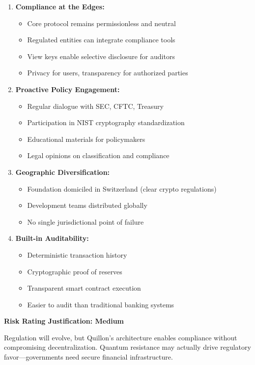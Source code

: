 \documentclass[11pt,a4paper]{article}
\begin{document}
\begin{enumerate}[leftmargin=*]
\item \textbf{Compliance at the Edges:}
\begin{itemize}
    \item Core protocol remains permissionless and neutral
    \item Regulated entities can integrate compliance tools
    \item View keys enable selective disclosure for auditors
    \item Privacy for users, transparency for authorized parties
\end{itemize}

\item \textbf{Proactive Policy Engagement:}
\begin{itemize}
    \item Regular dialogue with SEC, CFTC, Treasury
    \item Participation in NIST cryptography standardization
    \item Educational materials for policymakers
    \item Legal opinions on classification and compliance
\end{itemize}

\item \textbf{Geographic Diversification:}
\begin{itemize}
    \item Foundation domiciled in Switzerland (clear crypto regulations)
    \item Development teams distributed globally
    \item No single jurisdictional point of failure
\end{itemize}

\item \textbf{Built-in Auditability:}
\begin{itemize}
    \item Deterministic transaction history
    \item Cryptographic proof of reserves
    \item Transparent smart contract execution
    \item Easier to audit than traditional banking systems
\end{itemize}
\end{enumerate}

\textbf{Risk Rating Justification: Medium}

Regulation will evolve, but Quillon's architecture enables compliance without compromising decentralization. Quantum resistance may actually drive regulatory favor—governments need secure financial infrastructure.
\end{document}

